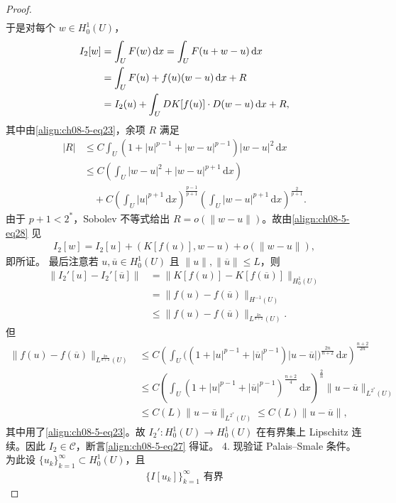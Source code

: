 \documentclass[../../main.tex]{subfiles}
\begin{document}
\begin{theorem}[存在性]
\begin{proof}
\begin{align*}
\end{align*}
于是对每个 $w\in H_0^1(U)$，
\begin{align}
I_2[w]&=\int_U F(w)\,\mathrm{d}x=\int_U F(u+w-u)\,\mathrm{d}x\notag\\
&=\int_U F(u)+f(u)(w-u)\,\mathrm{d}x+R\notag\\
&=I_2(u)+\int_U DK[f(u)]\cdot D(w-u)\,\mathrm{d}x+R,\label{align:ch08-5-eq30}
\end{align}
其中由\eqref{align:ch08-5-eq23}，余项 $R$ 满足
\begin{align*}
|R|&\leqslant C\int_U(1+|u|^{p-1}+|w-u|^{p-1})|w-u|^2\,\mathrm{d}x\\
&\leqslant C\left(\int_U|w-u|^2+|w-u|^{p+1}\,\mathrm{d}x\right)\\
&\quad+C\left(\int_U|u|^{p+1}\,\mathrm{d}x\right)^{\frac{p-1}{p+1}}\left(\int_U|w-u|^{p+1}\,\mathrm{d}x\right)^{\frac{2}{p+1}}.
\end{align*}
由于 $p+1<2^*$，Sobolev 不等式给出 $R=o(\|w-u\|)$。故由\eqref{align:ch08-5-eq28} 见
\begin{align*}
I_2[w]=I_2[u]+(K[f(u)],w-u)+o(\|w-u\|),
\end{align*}
即所证。
最后注意若 $u,\overline{u}\in H_0^1(U)$ 且 $\|u\|,\|\overline{u}\|\leqslant L$，则
\begin{align*}
\|I_2'[u]-I_2'[\overline{u}]\|&=\|K[f(u)]-K[f(\overline{u})]\|_{H_0^1(U)}\\
&=\|f(u)-f(\overline{u})\|_{H^{-1}(U)}\\
&\leqslant\|f(u)-f(\overline{u})\|_{L^{\frac{2n}{n+2}}(U)}.
\end{align*}
但
\begin{align*}
\|f(u)-f(\overline{u})\|_{L^{\frac{2n}{n+2}}(U)}&\leqslant C\left(\int_U\big((1+|u|^{p-1}+|\overline{u}|^{p-1})|u-\overline{u}|\big)^{\frac{2n}{n+2}}\,\mathrm{d}x\right)^{\frac{n+2}{2n}}\\
&\leqslant C\left(\int_U(1+|u|^{p-1}+|\overline{u}|^{p-1})^{\frac{n+2}{4}}\,\mathrm{d}x\right)^{\frac2n}\|u-\overline{u}\|_{L^{2^*}(U)}\\
&\leqslant C(L)\|u-\overline{u}\|_{L^{2^*}(U)}\leqslant C(L)\|u-\overline{u}\|,
\end{align*}
其中用了\eqref{align:ch08-5-eq23}。故 $I_2':H_0^1(U)\to H_0^1(U)$ 在有界集上 Lipschitz 连续。因此 $I_2\in\mathcal{C}$，断言\eqref{align:ch08-5-eq27} 得证。
4. 现验证 Palais--Smale 条件。为此设 $\{u_k\}_{k=1}^\infty\subset H_0^1(U)$，且
\begin{align}
\{I[u_k]\}_{k=1}^\infty\text{ 有界}\label{align:ch08-5-eq31}
\end{align}

\end{proof}
\end{theorem}
\end{document}

